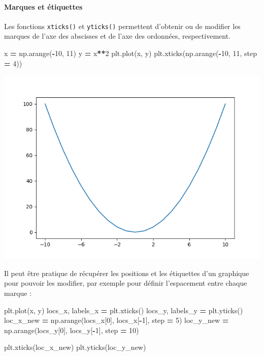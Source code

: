 \documentclass[12pt,]{book}
\newenvironment{Shaded}{\begin{snugshade}}{\end{snugshade}}
\newcommand{\DecValTok}[1]{\textcolor[rgb]{0.00,0.00,0.81}{#1}}
\newcommand{\OperatorTok}[1]{\textcolor[rgb]{0.81,0.36,0.00}{\textbf{#1}}}
\newcommand{\NormalTok}[1]{#1}
\let\oldparagraph\paragraph
\renewcommand{\paragraph}[1]{\oldparagraph{#1}\mbox{}}
\numberwithin{equation}{section}
\numberwithin{countremarque}{section}
\begin{document}
\paragraph{Marques et étiquettes}\label{marques-et-etiquettes}

Les fonctions \texttt{xticks()} et \texttt{yticks()} permettent
d'obtenir ou de modifier les marques de l'axe des abscisses et de l'axe
des ordonnées, respectivement.

\begin{Shaded}
\begin{Highlighting}[]
\NormalTok{x }\OperatorTok{=}\NormalTok{ np.arange(}\OperatorTok{-}\DecValTok{10}\NormalTok{, }\DecValTok{11}\NormalTok{)}
\NormalTok{y }\OperatorTok{=}\NormalTok{ x}\OperatorTok{**}\DecValTok{2}
\NormalTok{plt.plot(x, y)}
\NormalTok{plt.xticks(np.arange(}\OperatorTok{-}\DecValTok{10}\NormalTok{, }\DecValTok{11}\NormalTok{, step }\OperatorTok{=} \DecValTok{4}\NormalTok{))}
\end{Highlighting}
\end{Shaded}

\begin{center}\includegraphics[width=9.03in]{figs/pyplot/plot_ticks} \end{center}

Il peut être pratique de récupérer les positions et les étiquettes d'un
graphique pour pouvoir les modifier, par exemple pour définir
l'espacement entre chaque marque :

\begin{Shaded}
\begin{Highlighting}[]
\NormalTok{plt.plot(x, y)}
\NormalTok{locs_x, labels_x }\OperatorTok{=}\NormalTok{ plt.xticks()}
\NormalTok{locs_y, labels_y }\OperatorTok{=}\NormalTok{ plt.yticks()}
\NormalTok{loc_x_new }\OperatorTok{=}\NormalTok{ np.arange(locs_x[}\DecValTok{0}\NormalTok{], locs_x[}\OperatorTok{-}\DecValTok{1}\NormalTok{], step }\OperatorTok{=} \DecValTok{5}\NormalTok{)}
\NormalTok{loc_y_new }\OperatorTok{=}\NormalTok{ np.arange(locs_y[}\DecValTok{0}\NormalTok{], locs_y[}\OperatorTok{-}\DecValTok{1}\NormalTok{], step }\OperatorTok{=} \DecValTok{10}\NormalTok{)}

\NormalTok{plt.xticks(loc_x_new)}
\NormalTok{plt.yticks(loc_y_new)}
\end{Highlighting}
\end{Shaded}
\end{document}
